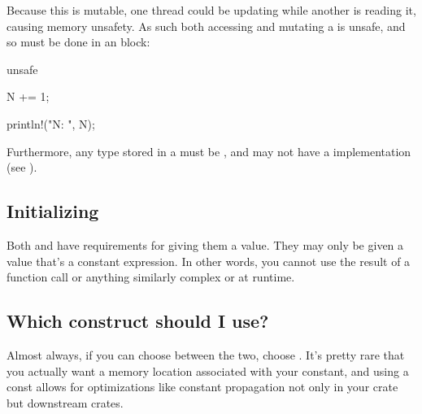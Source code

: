 Because this is mutable, one thread could be updating  while another is reading it, causing memory unsafety. As such both 
accessing and mutating a  is unsafe, and so must be done in an  block:

\begin{rustc}
unsafe {
    N += 1;

    println!("N: {}", N);
}
\end{rustc}

Furthermore, any type stored in a  must be , and may not have a  implementation (see ).

\subsection*{Initializing}

Both  and  have requirements for giving them a value. They may only be given a value that's a constant 
expression. In other words, you cannot use the result of a function call or anything similarly complex or at runtime.

\subsection*{Which construct should I use?}

Almost always, if you can choose between the two, choose . It's pretty rare that you actually want a memory location 
associated with your constant, and using a const allows for optimizations like constant propagation not only in your crate but 
downstream crates.
